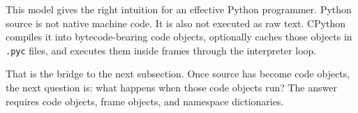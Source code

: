 This model gives the right intuition for an effective Python programmer. Python source is not native machine code. It is also not executed as raw text. CPython compiles it into bytecode-bearing code objects, optionally caches those objects in \texttt{.pyc} files, and executes them inside frames through the interpreter loop.

That is the bridge to the next subsection. Once source has become code objects, the next question is: what happens when those code objects run? The answer requires code objects, frame objects, and namespace dictionaries.
